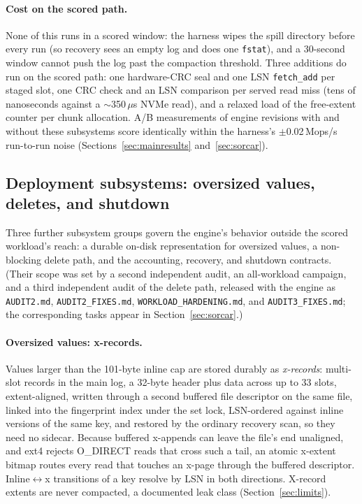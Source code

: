 \documentclass{article}
\begin{document}
\paragraph{Cost on the scored path.}
None of this runs in a scored window: the harness wipes the spill directory before every run (so recovery sees an empty log and does one \texttt{fstat}), and a 30-second window cannot push the log past the compaction threshold. Three additions do run on the scored path: one hardware-CRC seal and one LSN \texttt{fetch\_add} per staged slot, one CRC check and an LSN comparison per served read miss (tens of nanoseconds against a $\sim$350\,$\mu$s NVMe read), and a relaxed load of the free-extent counter per chunk allocation. A/B measurements of engine revisions with and without these subsystems score identically within the harness's $\pm$0.02\,Mops/s run-to-run noise (Sections~\ref{sec:mainresults} and~\ref{sec:sorcar}).

\subsection{Deployment subsystems: oversized values, deletes, and shutdown}
\label{sec:deploy}

Three further subsystem groups govern the engine's behavior outside the scored workload's reach: a durable on-disk representation for oversized values, a non-blocking delete path, and the accounting, recovery, and shutdown contracts. (Their scope was set by a second independent audit, an all-workload campaign, and a third independent audit of the delete path, released with the engine as \texttt{AUDIT2.md}, \texttt{AUDIT2\_FIXES.md}, \texttt{WORKLOAD\_HARDENING.md}, and \texttt{AUDIT3\_FIXES.md}; the corresponding tasks appear in Section~\ref{sec:sorcar}.)

\paragraph{Oversized values: x-records.}
Values larger than the 101-byte inline cap are stored durably as \emph{x-records}: multi-slot records in the main log, a 32-byte header plus data across up to 33 slots, extent-aligned, written through a second buffered file descriptor on the same file, linked into the fingerprint index under the set lock, LSN-ordered against inline versions of the same key, and restored by the ordinary recovery scan, so they need no sidecar. Because buffered x-appends can leave the file's end unaligned, and ext4 rejects O\_DIRECT reads that cross such a tail, an atomic x-extent bitmap routes every read that touches an x-page through the buffered descriptor. Inline$\leftrightarrow$x transitions of a key resolve by LSN in both directions. X-record extents are never compacted, a documented leak class (Section~\ref{sec:limits}).
\end{document}
